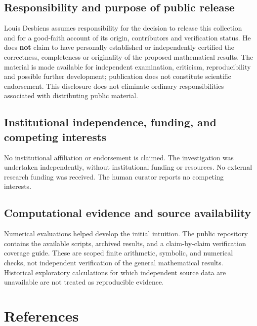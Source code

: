 \documentclass[
  11pt,
  a4paper,
]{article}
\begin{document}
\subsection{Responsibility and purpose of public
release}\label{responsibility-and-purpose-of-public-release}

Louis Desbiens assumes responsibility for the decision to release this
collection and for a good-faith account of its origin, contributors and
verification status. He does \textbf{not} claim to have personally
established or independently certified the correctness, completeness or
originality of the proposed mathematical results. The material is made
available for independent examination, criticism, reproducibility and
possible further development; publication does not constitute scientific
endorsement. This disclosure does not eliminate ordinary
responsibilities associated with distributing public material.

\subsection{Institutional independence, funding, and competing
interests}\label{institutional-independence-funding-and-competing-interests}

No institutional affiliation or endorsement is claimed. The
investigation was undertaken independently, without institutional
funding or resources. No external research funding was received. The
human curator reports no competing interests.

\subsection{Computational evidence and source
availability}\label{computational-evidence-and-source-availability}

Numerical evaluations helped develop the initial intuition. The public
repository contains the available scripts, archived results, and a
claim-by-claim verification coverage guide. These are scoped finite
arithmetic, symbolic, and numerical checks, not independent verification
of the general mathematical results. Historical exploratory calculations
for which independent source data are unavailable are not treated as
reproducible evidence.

\section{References}\label{references}
\end{document}
